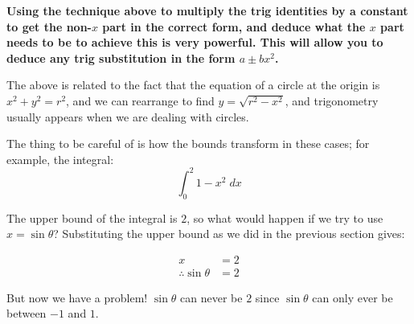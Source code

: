 \textbf{Using the technique above to 
multiply the trig identities by a constant to get the non-$x$ part in the correct form, and deduce what the $x$ part needs to be to achieve this is very powerful.
This will allow you to deduce any trig substitution in the form $a \pm bx^2$.}

The above is related to the fact that the equation of a circle at the origin is $x^2 + y^2 = r^2$, and we can rearrange to find $y = \sqrt{r^2 - x^2}$, and trigonometry usually appears when we are dealing with circles.

The thing to be careful of is how the bounds transform in these cases; for example, the integral:
\[\int_0^2 1-x^2 \; dx\] 

The upper bound of the integral is $2$, so what would happen if we try to use $x = \sin\theta$? Substituting the upper bound as we did in the previous section gives:

\begin{align*}
    x &= 2 \\
    \therefore \sin \theta &= 2
\end{align*}

But now we have a problem! $\sin \theta$ can never be $2$ since $\sin \theta$ can only ever be between $-1$ and $1$.


